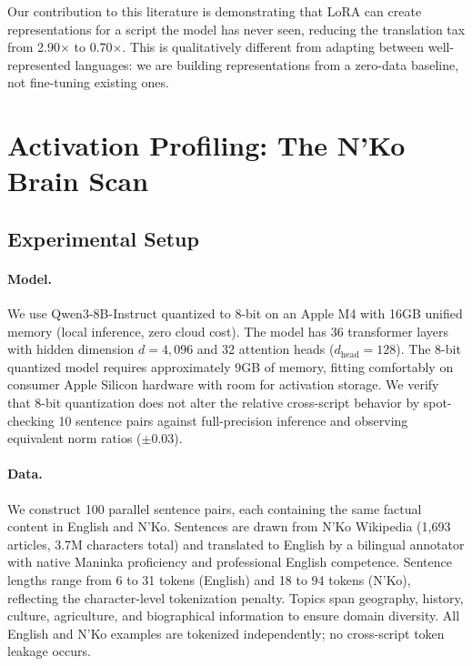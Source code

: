 \documentclass[11pt]{article}
\begin{document}
Our contribution to this literature is demonstrating that LoRA can create representations for a script the model has never seen, reducing the translation tax from 2.90$\times$ to 0.70$\times$.
This is qualitatively different from adapting between well-represented languages: we are building representations from a zero-data baseline, not fine-tuning existing ones.

\section{Activation Profiling: The N'Ko Brain Scan}
\label{sec:brain-scan}

\subsection{Experimental Setup}

\paragraph{Model.}
We use Qwen3-8B-Instruct quantized to 8-bit on an Apple M4 with 16GB unified memory (local inference, zero cloud cost).
The model has 36 transformer layers with hidden dimension $d = 4{,}096$ and 32 attention heads ($d_{\text{head}} = 128$).
The 8-bit quantized model requires approximately 9GB of memory, fitting comfortably on consumer Apple Silicon hardware with room for activation storage.
We verify that 8-bit quantization does not alter the relative cross-script behavior by spot-checking 10 sentence pairs against full-precision inference and observing equivalent norm ratios ($\pm$0.03).

\paragraph{Data.}
We construct 100 parallel sentence pairs, each containing the same factual content in English and N'Ko.
Sentences are drawn from N'Ko Wikipedia (1,693 articles, 3.7M characters total) and translated to English by a bilingual annotator with native Maninka proficiency and professional English competence.
Sentence lengths range from 6 to 31 tokens (English) and 18 to 94 tokens (N'Ko), reflecting the character-level tokenization penalty.
Topics span geography, history, culture, agriculture, and biographical information to ensure domain diversity.
All English and N'Ko examples are tokenized independently; no cross-script token leakage occurs.
\end{document}
